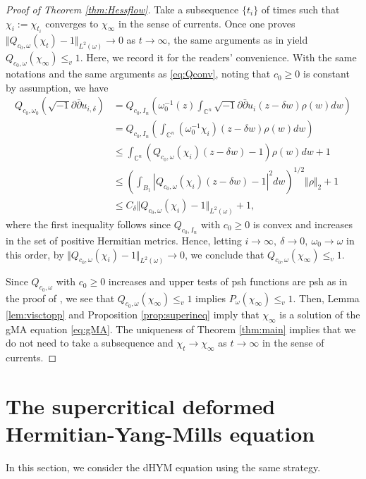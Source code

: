 \documentclass[10pt,a4paper]{amsart}
\numberwithin{equation}{section}
\newcommand{\delb}{\sqrt{-1}\partial\bar{\partial}}
\begin{document}
\begin{proof}[Proof of Theorem \ref{thm:Hessflow}]
    Take a subsequence $\{t_i\}$ of times such that $\chi_i:=\chi_{t_i}$ converges to $\chi_\infty$ in the sense of currents. Once one proves $\Vert Q_{c_0,\omega}(\chi_t)-1\Vert_{L^2(\omega)}\to0$ as $t\to\infty$, the same arguments as in \cite[Proposition 2.8]{Mur} yield $Q_{c_0,\omega}(\chi_\infty)\le_v1$. Here, we record it for the readers' convenience.
    With the same notations and the same arguments as \eqref{eq:Qconv}, noting that $c_0\ge0$ is constant by assumption, we have
    \begin{equation*}
        \begin{aligned}
            Q_{c_0,\omega_0}(\delb u_{i,\delta})
            &=Q_{c_0,I_n}\left(\omega_0^{-1}(z)\int_{\mathbb{C}^n}\delb u_i(z-\delta w)\rho(w)dw\right)\\
            &=Q_{c_0,I_n}\left(\int_{\mathbb{C}^n}(\omega_0^{-1}\chi_i)(z-\delta w)\rho(w)dw\right)\\
            &\le\int_{\mathbb{C}^n} \left(Q_{c_0,\omega}(\chi_i)(z-\delta w)-1\right)\rho(w)dw+1\\
            &\le\left(\int_{B_1} \left\vert Q_{c_0,\omega}(\chi_i)(z-\delta w)-1\right\vert^2dw\right)^{1/2}\Vert \rho\Vert_2+1\\
            &\le C_\delta \Vert Q_{c_0,\omega}(\chi_i)-1\Vert_{L^2(\omega)}+1,
        \end{aligned}
    \end{equation*}
    where the first inequality follows since $Q_{c_0,I_n}$ with $c_0\ge0$ is convex and increases in the set of positive Hermitian metrics. Hence, letting $i\to\infty, \ \delta\to0, \ \omega_0\to\omega$ in this order, by $\Vert Q_{c_0,\omega}(\chi_i)-1\Vert_{L^2(\omega)}\to0$, we conclude that $Q_{c_0,\omega}(\chi_\infty)\le_v1$. 
    
    Since $Q_{c_0,\omega}$ with $c_0\ge0$ increases and upper tests of psh functions are psh as in the proof of \cite[Proposition 1.3]{EGZ}, we see that $Q_{c_0,\omega}(\chi_\infty)\le_v1$ implies $P_\omega(\chi_\infty)\le_v1$. 
    Then, Lemma \ref{lem:visctopp} and Proposition \ref{prop:superineq} imply that $\chi_\infty$ is a solution of the gMA equation \eqref{eq:gMA}. The uniqueness of Theorem \ref{thm:main} implies that we do not need to take a subsequence and $\chi_t\to\chi_\infty$ as $t\to\infty$ in the sense of currents.
    \end{proof}

\section{The supercritical deformed Hermitian-Yang-Mills equation}\label{sec:dHYM}
In this section, we consider the dHYM equation using the same strategy. 
\end{document}
